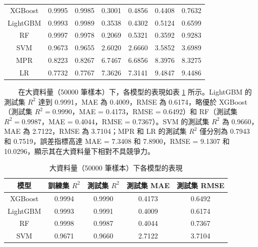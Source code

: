 \documentclass[12pt,a4paper]{article}
\begin{document}
\begin{enumerate}
\begin{enumerate}[label=\arabic*.]
\begin{enumerate}[label=3-2-\arabic*.]
\begin{enumerate}[label=\Alph*.]
\begin{table}[H]
\begin{tabular}{|c|c|c|c|c|c|c|}
                                \hline
                                XGBoost & 0.9995 & 0.9985 & 0.3001 & 0.4856 & 0.4408 & 0.7632 \\
                                LightGBM & 0.9993 & 0.9989 & 0.3538 & 0.4302 & 0.5124 & 0.6599 \\
                                RF & 0.9997 & 0.9978 & 0.2069 & 0.5321 & 0.3592 & 0.9283 \\
                                SVM & 0.9673 & 0.9655 & 2.6020 & 2.6660 & 3.5852 & 3.6989 \\
                                MPR & 0.8223 & 0.8267 & 6.7467 & 6.6856 & 8.3976 & 8.3275 \\
                                LR & 0.7732 & 0.7767 & 7.3626 & 7.3141 & 9.4847 & 9.4486 \\
                                \hline
                            \end{tabular}
                        \end{table}
                    　　在大資料量（50000 筆樣本）下，各模型的表現如表 \ref{table:large_data_50000} 所示。LightGBM 的測試集 \( R^2 \) 達到 0.9991，MAE 為 0.4009，RMSE 為 0.6174，略優於 XGBoost（測試集 \( R^2 = 0.9990 \)，MAE = 0.4173，RMSE = 0.6492）和 RF（測試集 \( R^2 = 0.9987 \)，MAE = 0.4044，RMSE = 0.7367）。SVM 的測試集 \( R^2 \) 為 0.9660，MAE 為 2.7122，RMSE 為 3.7104；MPR 和 LR 的測試集 \( R^2 \) 僅分別為 0.7943 和 0.7519，誤差指標高達 MAE = 7.3408 和 7.8900，RMSE = 9.1307 和 10.0296，顯示其在大資料量下相對不具競爭力。\\
                        \begin{table}[H]
                            \centering
                            \caption{大資料量（50000 筆樣本）下各模型的表現}
                            \label{table:large_data_50000}
                            \begin{tabular}{|c|c|c|c|c|}
                                \hline
                                模型 & 訓練集 \( R^2 \) & 測試集 \( R^2 \) & 測試集 MAE & 測試集 RMSE \\
                                \hline
                                XGBoost & 0.9994 & 0.9990 & 0.4173 & 0.6492 \\
                                LightGBM & 0.9993 & 0.9991 & 0.4009 & 0.6174 \\
                                RF & 0.9998 & 0.9987 & 0.4044 & 0.7367 \\
                                SVM & 0.9671 & 0.9660 & 2.7122 & 3.7104 \\

\end{tabular}
\end{table}
\end{enumerate}
\end{enumerate}
\end{enumerate}
\end{enumerate}
\end{document}
